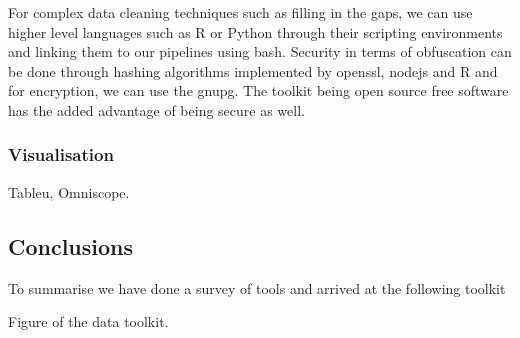 For complex data cleaning techniques such as filling in the gaps, we can use higher level languages such as R or Python through their scripting environments and linking them to our pipelines using bash.
Security in terms of obfuscation can be done through hashing algorithms implemented by openssl, nodejs and R and for encryption, we can use the gnupg.
The toolkit being open source free software has the added advantage of being secure as well.

\subsubsection{Visualisation}

Tableu, Omniscope.

\subsection{Conclusions}

To summarise we have done a survey of tools and arrived at the following toolkit

Figure of the data toolkit.



